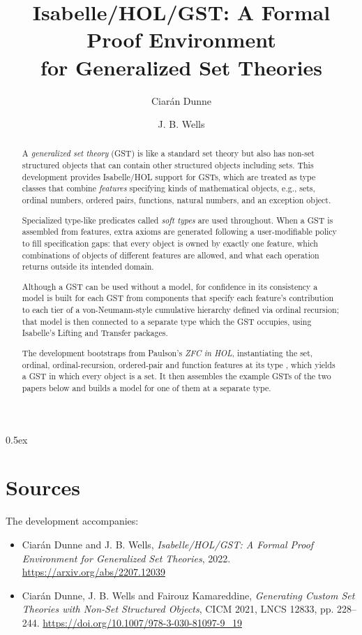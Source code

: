 \documentclass[11pt,a4paper]{article}
\begin{document}
\title{Isabelle/HOL/GST: A Formal Proof Environment\\ for Generalized Set Theories}
\author{Ciar\'an Dunne \and J. B. Wells}

\maketitle

\begin{abstract}
  A \emph{generalized set theory} (GST) is like a standard set theory but
  also has non-set structured objects that can contain other structured
  objects including sets.  This development provides Isabelle/HOL support for
  GSTs, which are treated as type classes that combine \emph{features}
  specifying kinds of mathematical objects, e.g., sets, ordinal numbers,
  ordered pairs, functions, natural numbers, and an exception object.

  Specialized type-like predicates called \emph{soft types} are used
  throughout.  When a GST is assembled from features, extra axioms are
  generated following a user-modifiable policy to fill specification gaps:
  that every object is owned by exactly one feature, which combinations of
  objects of different features are allowed, and what each operation returns
  outside its intended domain.

  Although a GST can be used without a model, for confidence in its
  consistency a model is built for each GST from components that specify each
  feature's contribution to each tier of a von-Neumann-style cumulative
  hierarchy defined via ordinal recursion; that model is then connected to a
  separate type which the GST occupies, using Isabelle's Lifting and Transfer
  packages.

  The development bootstraps from Paulson's \emph{ZFC in HOL}, instantiating
  the set, ordinal, ordinal-recursion, ordered-pair and function features at
  its type , which yields a GST in which every object is a set.  It
  then assembles the example GSTs of the two papers below and builds a model
  for one of them at a separate type.
\end{abstract}

\tableofcontents

\parindent 0pt\parskip 0.5ex

\section{Sources}

The development accompanies:

\begin{itemize}
  \item Ciar\'an Dunne and J. B. Wells, \emph{Isabelle/HOL/GST: A Formal
    Proof Environment for Generalized Set Theories}, 2022.
    \url{https://arxiv.org/abs/2207.12039}
  \item Ciar\'an Dunne, J. B. Wells and Fairouz Kamareddine,
    \emph{Generating Custom Set Theories with Non-Set Structured Objects},
    CICM 2021, LNCS 12833, pp. 228--244.
    \url{https://doi.org/10.1007/978-3-030-81097-9_19}
\end{itemize}


\end{document}
